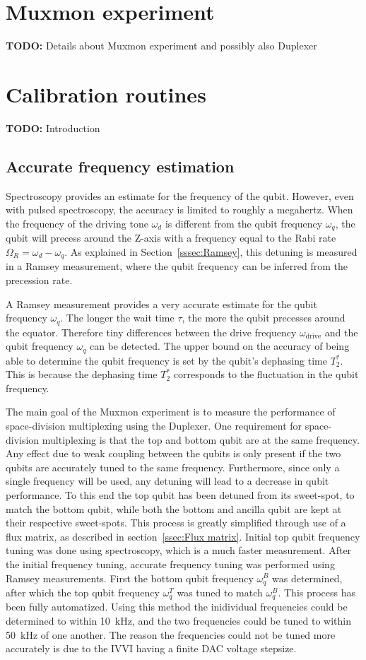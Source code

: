   \chapter{Muxmon experiment}
    \textbf{TODO:} Details about Muxmon experiment and possibly also Duplexer

  \chapter{Calibration routines}
    \textbf{TODO:} Introduction
    \section{Accurate frequency estimation}
      Spectroscopy provides an estimate for the frequency of the qubit. However, even with pulsed spectroscopy, the accuracy is limited to roughly a megahertz. When the frequency of the driving tone $\omega_d$ is different from the qubit frequency $\omega_q$, the qubit will precess around the Z-axis with a frequency equal to the Rabi rate $\Omega_R = \omega_d - \omega_q$. As explained in Section~\ref{sssec:Ramsey}, this detuning is measured in a Ramsey measurement, where the qubit frequency can be inferred from the precession rate.

      A Ramsey measurement provides a very accurate estimate for the qubit frequency $\omega_q$. The longer the wait time $\tau$, the more the qubit precesses around the equator. Therefore tiny differences between the drive frequency $\omega_\text{drive}$ and the qubit frequency $\omega_q$ can be detected. The upper bound on the accuracy of being able to determine the qubit frequency is set by the qubit's dephasing time $T_2^*$. This is because the dephasing time $T_2^*$ corresponds to the fluctuation in the qubit frequency.

      The main goal of the Muxmon experiment is to measure the performance of space-division multiplexing using the Duplexer. One requirement for space-division multiplexing is that the top and bottom qubit are at the same frequency. Any effect due to weak coupling between the qubits is only present if the two qubits are accurately tuned to the same frequency. Furthermore, since only a single frequency will be used, any detuning will lead to a decrease in qubit performance. To this end the top qubit has been detuned from its sweet-spot, to match the bottom qubit, while both the bottom and ancilla qubit are kept at their respective sweet-spots. This process is greatly simplified through use of a flux matrix, as described in section~\ref{ssec:Flux matrix}. Initial top qubit frequency tuning was done using spectroscopy, which is a much faster measurement. After the initial frequency tuning, accurate frequency tuning was performed using Ramsey measurements. First the bottom qubit frequency $\omega_q^B$ was determined, after which the top qubit frequency $\omega_q^T$  was tuned to match $\omega_q^B$. This process has been fully automatized. Using this method the inidividual frequencies could be determined to within \SI{10}{\kilo \hertz}, and the two frequencies could be tuned to within \SI{50}{\kilo \hertz} of one another. The reason the frequencies could not be tuned more accurately is due to the IVVI having a finite DAC voltage stepsize.

